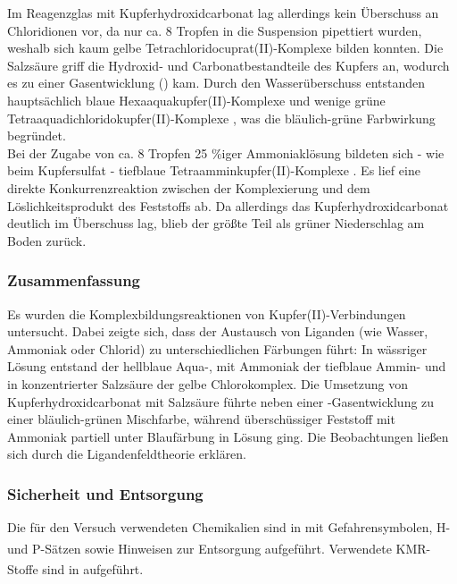 \documentclass[
	a4paper,										%
	12pt,											%
	twoside,										%
	headsepline,								%
	footsepline,									%
	captions=tableheading,					%
]{scrartcl}
\newcommand{\zitat}[1]{\textsuperscript{\cite{#1}}}
\begin{document}
	Im Reagenzglas mit Kupferhydroxidcarbonat lag allerdings kein Überschuss an Chloridionen vor, da nur ca. 8 Tropfen in die Suspension pipettiert wurden,
	weshalb sich kaum gelbe Tetrachloridocuprat(II)-Komplexe  bilden konnten. Die Salzsäure griff die Hydroxid- 
	und Carbonatbestandteile des Kupfers an, wodurch es zu einer Gasentwicklung () kam. Durch den Wasserüberschuss entstanden hauptsächlich blaue Hexaaquakupfer(II)-Komplexe 
	und wenige grüne Tetraaquadichloridokupfer(II)-Komplexe , was die bläulich-grüne Farbwirkung begründet.\\

	Bei der Zugabe von ca. 8 Tropfen 25 \%iger Ammoniaklösung bildeten sich - wie beim Kupfersulfat - tiefblaue Tetraamminkupfer(II)-Komplexe .
	Es lief eine direkte Konkurrenzreaktion zwischen der Komplexierung und dem Löslichkeitsprodukt des Feststoffs ab.
	Da allerdings das Kupferhydroxidcarbonat deutlich im Überschuss lag, blieb der größte Teil als grüner Niederschlag am Boden zurück.

\subsubsection{Zusammenfassung}

	Es wurden die Komplexbildungsreaktionen von Kupfer(II)-Verbindungen untersucht.
	Dabei zeigte sich, dass der Austausch von Liganden (wie Wasser, Ammoniak oder Chlorid) zu unterschiedlichen Färbungen führt:
	In wässriger Lösung entstand der hellblaue Aqua-, mit Ammoniak der tiefblaue Ammin- und in konzentrierter Salzsäure der gelbe Chlorokomplex.
	Die Umsetzung von Kupferhydroxidcarbonat mit Salzsäure führte neben einer -Gasentwicklung zu einer bläulich-grünen Mischfarbe,
	während überschüssiger Feststoff mit Ammoniak partiell unter Blaufärbung in Lösung ging.
	Die Beobachtungen ließen sich durch die Ligandenfeldtheorie erklären.

\subsubsection{Sicherheit und Entsorgung}
		
Die für den Versuch verwendeten Chemikalien sind in  mit Gefahrensymbolen, H- und P-Sätzen sowie Hinweisen zur Entsorgung aufgeführt.\zitat{hauke3} Verwendete KMR-Stoffe sind in  aufgeführt.\zitat{hauke3}
	
\end{document}
